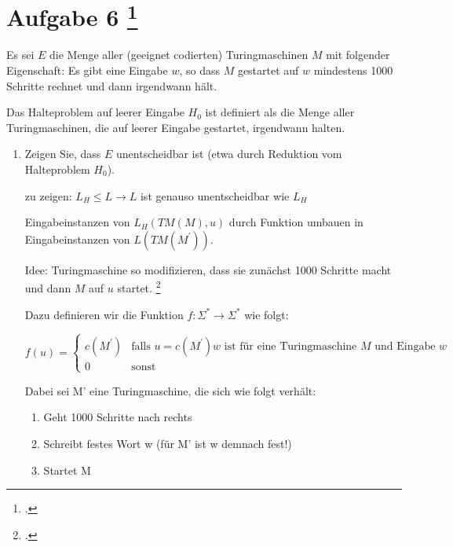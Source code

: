 \documentclass{bschlangaul-aufgabe}
\begin{document}
\section{Aufgabe 6
\footcite{examen:66115:2017:03}}

Es sei $E$ die Menge aller (geeignet codierten) Turingmaschinen $M$ mit
folgender Eigenschaft: Es gibt eine Eingabe $w$, so dass $M$ gestartet
auf $w$ mindestens 1000 Schritte rechnet und dann irgendwann hält.

Das Halteproblem auf leerer Eingabe $H_0$ ist definiert als die Menge
aller Turingmaschinen, die auf leerer Eingabe gestartet, irgendwann
halten.

\begin{enumerate}


\item Zeigen Sie, dass $E$ unentscheidbar ist (etwa durch Reduktion vom
Halteproblem $H_0$).

\begin{liAntwort}
zu zeigen: $L_H \leq L \rightarrow L$ ist genauso unentscheidbar wie $L_H$

Eingabeinstanzen von $L_H (TM(M), u)$ durch Funktion umbauen in
Eingabeinstanzen von $L (TM (M^\prime))$.

Idee: Turingmaschine so modifizieren, dass sie zunächst
1000 Schritte macht und dann $M$ auf $u$ startet.
\footcite[Seite 53]{theo:fs:4}

Dazu definieren wir die Funktion $f : \Sigma^* \rightarrow \Sigma^*$ wie
folgt:

\begin{equation*}
f(u) =
\begin{cases}
c(M^\prime) &
\text{falls }u = c(M^\prime)w\text{ ist für eine Turingmaschine }M\text{ und Eingabe }w\\

0 & \text{sonst}
\end{cases}
\end{equation*}

Dabei sei M’ eine Turingmaschine, die sich wie folgt verhält:
\begin{enumerate}
\item Geht 1000 Schritte nach rechts
\item Schreibt festes Wort w (für M’ ist w demnach fest!)
\item Startet M
\end{enumerate}


\end{liAntwort}
\end{enumerate}
\end{document}
